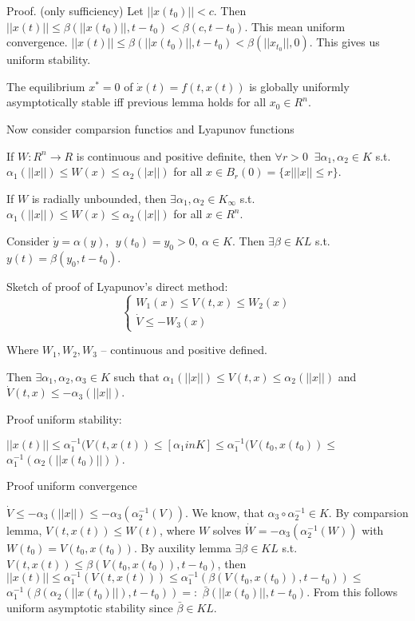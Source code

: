  Proof. (only sufficiency) Let $||x(t_0)||<c$. Then 
 $||x(t)|| \le \beta(||x(t_0)||, t-t_0) < \beta(c,t-t_0)$. This mean uniform convergence.
 $||x(t)||\le\beta(||x(t_0)||, t-t_0)<\beta(||x_{t_0}||, 0)$. This gives us uniform
 stability.

 The equilibrium $x^*=0$ of $\dot x(t)=f(t,x(t))$ is globally uniformly asymptotically 
 stable iff previous lemma holds for all $x_0\in R^n$.

Now consider comparsion functios and Lyapunov functions

If $W:R^n \to R$ is continuous and positive definite, then $\forall r>0\ $
$\exists \alpha_1, \alpha_2 \in K$ s.t. $\alpha_1(||x||) \le W(x)\le \alpha_2(|x||)$ for 
all $x\in B_r(0)=\{x|||x||\le r\}$.

If $W$ is radially unbounded, then $\exists \alpha_1,\alpha_2\in K_\infty$ s.t.
$\alpha_1(||x||) \le W(x)\le\alpha_2(|x||)$ for all $x\in R^n$.

 Consider $\dot y=\alpha(y),\ \ y(t_0)=y_0>0, \ \alpha\in K$. Then 
 $\exists \beta\in KL$ s.t. $y(t)=\beta(y_0, t-t_0)$.

Sketch of proof of Lyapunov's direct method:
\begin{equation*}
\begin{cases}
 W_1(x)\le V(t,x) \le W_2(x) \\
 \dot V \le -W_3(x)
\end{cases}
\end{equation*}


Where $W_1, W_2, W_3$ -- continuous and positive defined.

Then $\exists \alpha_1,\alpha_2,\alpha_3\in K$ such that 
$\alpha_1(||x||)\le V(t,x)\le \alpha_2(||x||)$ and $\dot V(t,x)\le -\alpha_3(||x||)$.

Proof uniform stability:

$||x(t)||\le\alpha^{-1}_1(V(t,x(t)) \le [\alpha_1 in K] \le \alpha^{-1}_1(V(t_0,x(t_0)) \le$
$\alpha^{-1}_1(\alpha_2(||x(t_0)||))$.

Proof uniform convergence

$\dot V \le -\alpha_3(||x||)\le -\alpha_3(\alpha_2^{-1}(V))$. We know, that 
$\alpha_3 \circ \alpha_2^{-1} \in K$. By comparsion lemma, $V(t,x(t))\le W(t)$, where $W$
solves $\dot W=-\alpha_3(\alpha_2^{-1}(W))$ with $W(t_0)=V(t_0,x(t_0))$. By auxility lemma
$\exists \beta\in KL$ s.t. $V(t,x(t))\le\beta(V(t_0,x(t_0)), t-t_0)$, then
$||x(t)||\le\alpha^{-1}_1(V(t,x(t)))\le\alpha^{-1}_1(\beta(V(t_0,x(t_0)), t-t_0))\le$
$\alpha_1^{-1}(\beta(\alpha_2(||x(t_0)||),t-t_0))=:$
$\bar{\beta}(||x(t_0)||,t-t_0)$. From this follows uniform asymptotic stability since
$\bar{\beta}\in KL$.


